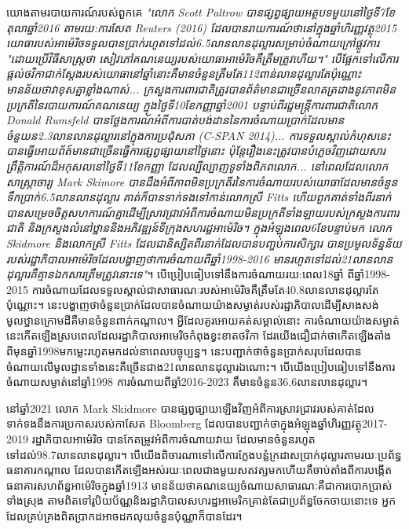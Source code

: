 \documentclass[10pt,twocolumn,letterpaper]{article}
\begin{document}
	យោងតាមរបាយការណ៍របស់ពួកគេ \textit{"លោក Scott Paltrow  បានផ្សព្វផ្សាយអត្ថបទមួយនៅថ្ងៃទី7ខែតុលាឆ្នាំ2016 តាមរយ:ការសែត Reuters (2016) ដែលបានរាយការណ៍ថានៅក្នុងឆ្នាំហិរញ្ញវត្ថុ2015 យោធារបស់អាម៉េរិចទទួលបានប្រាក់រហូតទៅដល់6.5លានលានដុល្លារសម្រាប់ចំណាយក្រៅផ្លូវការ "ដោយប្រើវិធីសាស្ត្រថា សៀវភៅគណនេយ្យរបស់យោធាអាម៉េរិចគឺត្រឹមត្រូវហើយ។" បើផ្អែកទៅលើការផ្តល់ថវិកាជាក់ស្តែងរបស់យោធានៅឆ្នាំនោះគឺមានចំនួនត្រឹមតែ112ពាន់លានដុល្លារតែប៉ុណ្ណោះ មានន័យថាវាខុសគ្នាខ្លាំងណាស់... ក្រសួងការពារជាតិត្រូវបានព័ត៌មានជាច្រើនលាតត្រដាងនូវភាពមិនប្រក្រតីនៃរបាយការណ៍គណនេយ្យ ក្នុងថ្ងៃទី10ខែកញ្ញាឆ្នាំ2001  បន្ទាប់ពីរដ្ឋមន្ត្រីការពារជាតិលោក Donald Rumsfeld បានថ្លែងការណ៍អំពីការបាត់បង់ដាននៃការចំណាយប្រាក់ដែលមានចំនួយន2.3លានលានដុល្លារនៅក្នុងការប្រជុំសភា (C-SPAN 2014)... ការទទួលស្គាល់កំហុសនេះបានធ្វើអោយព័ត៍មានជាច្រើនធ្វើការផ្សព្វផ្សាយនៅថ្ងៃនោះ ប៉ុន្តែរឿងនេះត្រូវបានបំភ្លេចវិញដោយសារព្រឹត្តិការណ៍ដ៏អកុសលនៅថ្ងៃទី11ខែកញ្ញា ដែលល្បីល្បាញទូទាំងពិភពលោក... នៅពេលដែលលោកសាស្រ្តាចារ្យ Mark Skimore បានដឹងអំពីភាពមិនប្រក្រតីរនៃការចំណាយរបស់យោធាដែលមានចំនួនទឹកប្រាក់6.5លានលានដុល្លារ គាត់ក៏បានទាក់ទងទៅកាន់លោកស្រី Fitts ហើយពួកគាត់ទាំងពីរនាក់បានសម្រេចចិត្តសហការណ៍គ្នាដើម្បីស្រាវជ្រាវអំពីការចំណាយមិនប្រក្រតីទាំងឡាយរបស់ក្រសួងការពារជាតិ និងក្រសួងលំនៅឋ្ឋាននិងអភិវឌ្ឍន៍ទីក្រុងសហរដ្ឋអាម៉េរិច។  ក្នុងអំឡុងពេល6ខែបន្ទាប់មក លោក Skidmore និងលោកស្រី Fitts ដែលជានិស្សិតពីរនាក់ដែលបានបញ្ចប់ការសិក្សារ បានប្រមូលទ័ន្នន័យរបស់រដ្ឋាភិបាលអាម៉េរិចដែលបង្ហាញថាការចំណាយពីឆ្នាំ1998-2016 មានរហូតទៅដល់21លានលានដុល្លារគឺគ្មានឯកសារត្រឹមត្រូវនោះទេ"}\cite{12}។  បើប្រៀបធៀបទៅនឹងការចំណាយរយ:ពេល18ឆ្នាំ ពីឆ្នាំ1998-2015 ការចំណាយដែលទទួលស្គាល់ជាសាធារណៈរបស់អាម៉េរិចគឹត្រឹមតែ40.8លានលានដុល្លារតែប៉ុណ្ណោះ\cite{15}។ នេះបង្ហាញថាចំនួនប្រាក់ដែលបានចំណាយយ៉ាងសម្ងាត់របស់រដ្ឋាភិបាលដើម្បីសាងសង់មូលឋ្ឋានក្រោមដីគឺមានចំនួនពាក់កណ្តាល។ អ្វីដែលគូរអោយគត់សម្គាល់នោះ ការចំណាយយ៉ាងសម្ងាត់នេះកើតឡើងស្របពេលដែលរដ្ឋាភិបាលអាមេរិចកំពុងខ្វះខាតថវិកា ដែរយើងជឿជាក់ថាកើតឡើងតាំងពីមុនឆ្នាំ1998មកម្លេះរហូតមកដល់នាពេលបច្ចុប្បន្ន។ នេះបញ្ជាក់ថាចំនួនប្រាក់សរុបដែលបានចំណាយលើមូលដ្ឋានទាំងនេះគឺច្រើនជាង21លានលានដុល្លារឯណោះ។ បើយើងប្រៀបធៀបទៅនឹងការចំណាយសម្ងាត់នៅឆ្នាំ1998 ការចំណាយពីឆ្នាំ2016-2023 គឹមានចំនួន36.6លានលានដុល្លារ។

	នៅឆ្នាំ2021 លោក Mark Skidmore បានផ្សព្វផ្សាយឡើងវិញអំពីការស្រាវជ្រាវរបស់គាត់ដែលទាក់ទងនឹងការប្រកាសរបស់កាសែត Bloomberg ដែលបានបញ្ជាក់ថាក្នុងអំឡុងឆ្នាំហិរញ្ញវត្ថុ2017-2019 រដ្ឋាភិបាលអាម៉េរិច បានកែតម្រូវអំពីការចំណាយវាយ ដែលមានចំនួនរហូតទៅដល់98.7លានលានដុល្លារ\cite{17,18}។ បើយើងពិចារណាទៅលើការក្លែងបន្លំក្រដាសប្រាក់ដុល្លារតាមរយៈប្រព័ន្ធធនាគារកណ្តាល ដែលបានកើតឡើងអស់រយៈពេលជាងមួយសតវត្សមកហើយគឹចាប់តាំងពីការបង្កើតធនាគារសហព័ន្ធអាម៉េរិចក្នុងឆ្នាំ1913\cite{37} មានន័យថាគណនេយ្យចំណាយសាធារណៈគឺជាការបោកប្រាស់ទាំងស្រុង តាមពិតទៅរូបិយប័ណ្ណនិងរដ្ឋាភិបាលសហរដ្ឋអាមេរិកគ្រាន់តែជាប្រព័ន្ធចែកចាយនោះទេ អ្នកដែលគ្រប់គ្រងពិតប្រាកដអាចដកលុយចំនួនប៉ុណ្ណាក៏បានដែរ។
\end{document}
